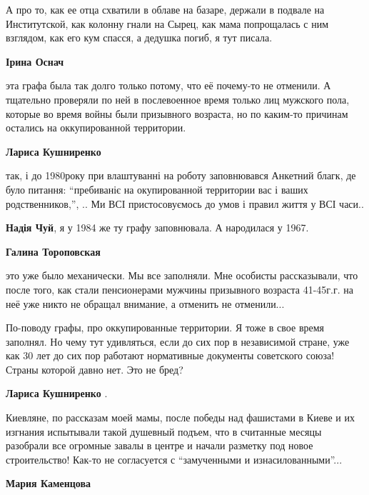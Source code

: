 \begin{itemize}
\begin{itemize}
А про то, как ее отца схватили в облаве на базаре, держали в подвале на
Институтской, как колонну гнали на Сырец, как мама попрощалась с ним взглядом,
как его кум спасся, а дедушка погиб, я тут писала.

\begin{itemize} %
\textbf{Ірина Оснач} 

эта графа была так долго только потому, что её почему-то не отменили. А
тщательно проверяли по ней в послевоенное время только лиц мужского пола,
которые во время войны были призывного возраста, но по каким-то причинам
остались на оккупированной территории.

\end{itemize} %

\textbf{Лариса Кушниренко} 

так, і до 1980року при влаштуванні на роботу заповнювався Анкетний благк, де
було питання: \enquote{пребиваніє на окупированной территории вас і ваших
родственников,}, .. Ми ВСІ пристосовуємось до умов і правил життя у ВСІ часи..

\begin{itemize} %
\textbf{Надія Чуй}, я у 1984 же ту графу заповнювала. А народилася у 1967.

\textbf{Галина Тороповская} 

это уже было механически. Мы все заполняли. Мне особисты рассказывали, что
после того, как стали пенсионерами мужчины призывного возраста 41-45г.г. на неё
уже никто не обращал внимание, а отменить не отменили...

\end{itemize} %


По-поводу графы, про оккупированные территории. Я тоже в свое время заполнял.
Но чему тут удивляться, если до сих пор в независимой стране, уже как 30 лет до
сих пор работают нормативные документы советского союза! Страны которой давно
нет. Это не бред?


\textbf{Лариса Кушниренко} . 

Киевляне, по рассказам моей мамы, после победы над фашистами в Киеве и их
изгнания испытывали такой душевный подъем, что в считанные месяцы разобрали все
огромные завалы в центре и начали разметку под новое строительство! Как-то не
согласуется с \enquote{замученными и изнасилованными}...

\textbf{Мария Каменцова} 


\end{itemize}
\end{itemize}
